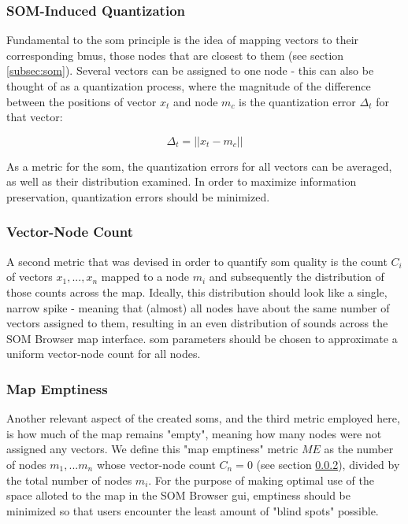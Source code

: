 \subsubsection{SOM-Induced Quantization}
\label{subsubsec:som_quantization}
Fundamental to the \gls{som} principle is the idea of mapping vectors to their
corresponding \glspl{bmu}, those nodes that are closest to them (see section
\ref{subsec:som}). Several vectors can be assigned to one node - this can also
be thought of as a quantization process, where the magnitude of the difference
between the positions of vector $ x_t $ and node $ m_c $ is the quantization
error $ \Delta_t $ for that vector:

\begin{equation}
  \Delta_t = || x_t - m_c ||
\end{equation}

As a metric for the \gls{som}, the quantization errors for all vectors can be
averaged, as well as their distribution examined. In order to maximize
information preservation, quantization errors should be minimized.

\subsubsection{Vector-Node Count}
\label{subsubsec:vector_node_count}
A second metric that was devised in order to quantify \gls{som} quality is the
count $ C_i $ of vectors $ x_1, ... , x_n $ mapped to a node $ m_i $ and
subsequently the distribution of those counts across the map. Ideally, this
distribution should look like a single, narrow spike - meaning that (almost) all
nodes have about the same number of vectors assigned to them, resulting in an
even distribution of sounds across the SOM Browser map interface. \gls{som}
parameters should be chosen to approximate a uniform vector-node count for all
nodes.

\subsubsection{Map Emptiness}
\label{subsubsec:map_emptiness}
Another relevant aspect of the created \glspl{som}, and the third metric
employed here, is how much of the map remains "empty", meaning how many nodes
were not assigned any vectors. We define this "map emptiness" metric $ ME $ as
the number of nodes $ m_1, ... m_n $ whose vector-node count $ C_n = 0 $ (see
section \ref{subsubsec:vector_node_count}), divided by the total number of nodes
$ m_i $. For the purpose of making optimal use of the space alloted to the map
in the SOM Browser \gls{gui}, emptiness should be minimized so that users
encounter the least amount of "blind spots" possible.

